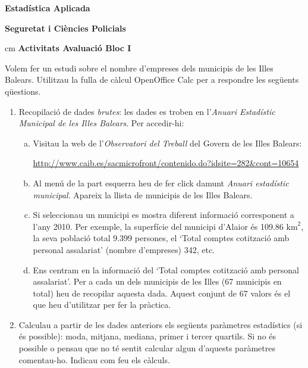 \documentclass[a4paper,12pt]{report}
\begin{document}
\begin{center}
\textbf{\large Estadística Aplicada}

\textbf{\large Seguretat i Ciències Policials}

 cm
\textbf{\large Activitats Avaluació Bloc I}
\end{center}

\vskip 1cm
Volem fer un estudi sobre el nombre d'empreses dels municipis de les
Illes Balears. Utilitzau la fulla de càlcul OpenOffice Calc per a respondre
les següents qüestions.

\begin{enumerate}
\item Recopilació de dades \textit{brutes}: les dades es troben
en l'\textit{Anuari Estadístic Municipal de les Illes Balears}. Per accedir-hi:

\begin{enumerate}[a)]
\item Visitau la web de l'\textit{Observatori del Treball} del Govern
de les Illes Balears:

\url{http://www.caib.es/sacmicrofront/contenido.do?idsite=282&cont=10654}

\item Al menú de la part esquerra heu de fer click damunt \textit{Anuari estadístic municipal}.
Apareix la llista de municipis de les Illes Balears.

\item Si seleccionau un municipi es mostra diferent informació corresponent a l'any 2010.
Per exemple, la superfície del municipi d'Alaior és 109.86 $\mathrm{km}^2$, la seva població 
total 9.399 persones, el `Total comptes cotització amb personal assalariat' (nombre d'empreses) 342, etc.

\item Ens centram en la informació del `Total comptes cotització amb personal assalariat'. Per a cada un dels
municipis de les Illes (67 municipis en total) heu de recopilar aquesta dada. 
Aquest conjunt de 67 valors és el que heu d'utilitzar per fer la pràctica.
\end{enumerate}

\item Calculau a partir de les dades anteriors els següents paràmetres estadístics 
(si és possible): moda, mitjana, mediana, primer i tercer quartils.
Si no és possible o pensau que no té sentit calcular algun d'aquests paràmetres
comentau-ho. Indicau com feu els càlculs.


\end{enumerate}
\end{document}
